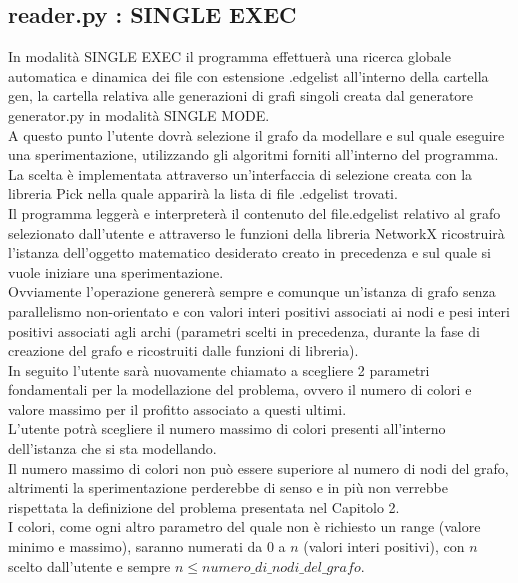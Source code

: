 \subsection{reader.py : SINGLE EXEC}
\justify
In modalità SINGLE EXEC il programma effettuerà una ricerca globale automatica e dinamica dei file con estensione .edgelist all'interno della cartella gen, la cartella relativa alle generazioni di grafi singoli creata dal generatore generator.py in modalità SINGLE MODE.\\

A questo punto l'utente dovrà selezione il grafo da modellare e sul quale eseguire una sperimentazione, utilizzando gli algoritmi forniti all'interno del programma.\\
La scelta è implementata attraverso un'interfaccia di selezione creata con la libreria Pick nella quale apparirà la lista di file .edgelist trovati.\\

Il programma leggerà e interpreterà il contenuto del file.edgelist relativo al grafo selezionato dall'utente e attraverso le funzioni della libreria NetworkX ricostruirà l'istanza dell'oggetto matematico desiderato creato in precedenza e sul quale si vuole iniziare una sperimentazione.\\

Ovviamente l'operazione genererà sempre e comunque un'istanza di grafo senza parallelismo non-orientato e con valori interi positivi associati ai nodi e pesi interi positivi associati agli archi (parametri scelti in precedenza, durante la fase di creazione del grafo e ricostruiti dalle funzioni di libreria).\\

In seguito l'utente sarà nuovamente chiamato a scegliere 2 parametri fondamentali per la modellazione del problema, ovvero il numero di colori e valore massimo per il profitto associato a questi ultimi.\\

L'utente potrà scegliere il numero massimo di colori presenti all'interno dell'istanza che si sta modellando.\\
Il numero massimo di colori non può essere superiore al numero di nodi del grafo, altrimenti la sperimentazione perderebbe di senso e in più non verrebbe rispettata la definizione del problema presentata nel Capitolo 2.\\
I colori, come ogni altro parametro del quale non è richiesto un range (valore minimo e massimo), saranno numerati da 0 a \(n\) (valori interi positivi), con \(n\) scelto dall'utente e sempre \(n \leq numero\_di\_nodi\_del\_grafo\).\\

